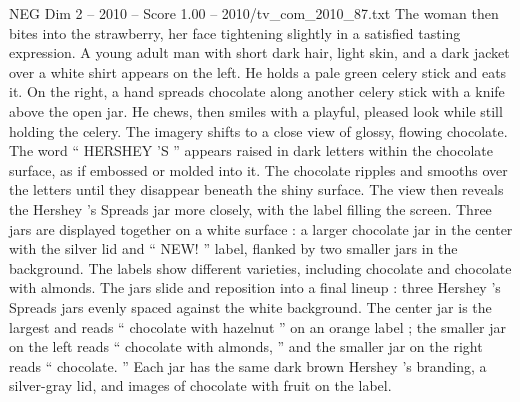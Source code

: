 \begin{textsample}{NEG Dim 2 – 2010 – Score 1.00 – 2010/tv\_com\_2010\_87.txt}
The woman then bites into the strawberry, her face tightening slightly in a satisfied tasting expression.
A young adult man with short dark hair, light skin, and a dark jacket over a white shirt appears on the left.
He holds a pale green celery stick and eats it.
On the right, a hand spreads chocolate along another celery stick with a knife above the open jar.
He chews, then smiles with a playful, pleased look while still holding the celery.
The imagery shifts to a close view of glossy, flowing chocolate.
The word “ HERSHEY ’S ” appears raised in dark letters within the chocolate surface, as if embossed or molded into it.
The chocolate ripples and smooths over the letters until they disappear beneath the shiny surface.
The view then reveals the Hershey ’s Spreads jar more closely, with the label filling the screen.
Three jars are displayed together on a white surface : a larger chocolate jar in the center with the silver lid and “ NEW! ” label, flanked by two smaller jars in the background.
The labels show different varieties, including chocolate and chocolate with almonds.
The jars slide and reposition into a final lineup : three Hershey ’s Spreads jars evenly spaced against the white background.
The center jar is the largest and reads “ chocolate with hazelnut ” on an orange label ; the smaller jar on the left reads “ chocolate with almonds, ” and the smaller jar on the right reads “ chocolate. ” Each jar has the same dark brown Hershey ’s branding, a silver-gray lid, and images of chocolate with fruit on the label.

\end{textsample}
